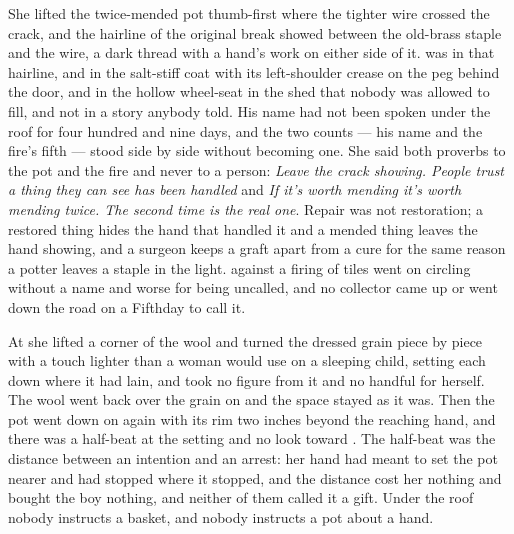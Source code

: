 She lifted the twice-mended pot thumb-first where the tighter wire crossed the crack, and the hairline of the original break showed between the old-brass staple and the wire, a dark thread with a hand's work on either side of it.  was in that hairline, and in the salt-stiff coat with its left-shoulder crease on the peg behind the door, and in the hollow wheel-seat in the shed that nobody was allowed to fill, and not in a story anybody told. His name had not been spoken under the roof for four hundred and nine days, and the two counts --- his name and the fire's fifth --- stood side by side without becoming one. She said both proverbs to the pot and the fire and never to a person: \emph{Leave the crack showing. People trust a thing they can see has been handled} and \emph{If it's worth mending it's worth mending twice. The second time is the real one}. Repair was not restoration; a restored thing hides the hand that handled it and a mended thing leaves the hand showing, and a surgeon keeps a graft apart from a cure for the same reason a potter leaves a staple in the light.  against a firing of tiles went on circling without a name and worse for being uncalled, and no collector came up or went down the road on a Fifthday to call it.

At  she lifted a corner of the wool and turned the dressed grain piece by piece with a touch lighter than a woman would use on a sleeping child, setting each down where it had lain, and took no figure from it and no handful for herself. The wool went back over the grain on  and the space stayed as it was. Then the pot went down on  again with its rim two inches beyond the reaching hand, and there was a half-beat at the setting and no look toward . The half-beat was the distance between an intention and an arrest: her hand had meant to set the pot nearer and had stopped where it stopped, and the distance cost her nothing and bought the boy nothing, and neither of them called it a gift. Under the roof nobody instructs a basket, and nobody instructs a pot about a hand.

